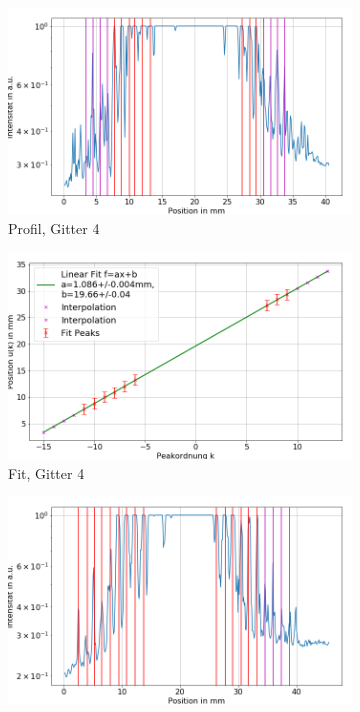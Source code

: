 \documentclass[
	a4paper,
	12pt,
	pagesize,
	ngerman
]{scrartcl}
\begin{document}
	\begin{figure}[H]\ContinuedFloat
        \centering
				\begin{subfigure}[b]{0.475\textwidth}
            \centering
            \includegraphics[width=\textwidth]{img/3/3_trafo_g4}
            \caption%
            {Profil, Gitter 4}
            \label{fig_3_profil_g4}
        \end{subfigure}
        \hfill
        \begin{subfigure}[b]{0.475\textwidth}
            \centering
            \includegraphics[width=\textwidth]{img/3/3_trafo_g4_fit}
            \caption[]%
            {Fit, Gitter 4}
            \label{fig_3_fit_g4}
        \end{subfigure}
        \begin{subfigure}[b]{0.475\textwidth}
            \centering
            \includegraphics[width=\textwidth]{img/3/3_trafo_g5}

\end{subfigure}
\end{figure}
\end{document}
